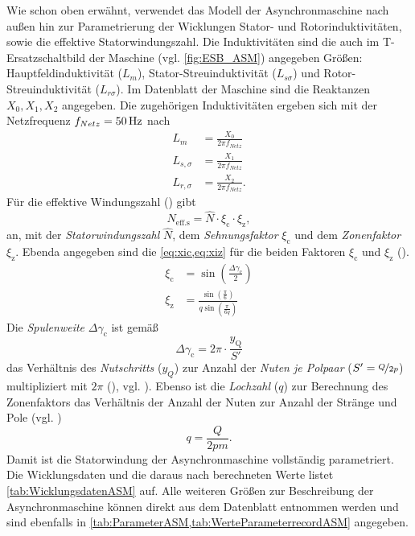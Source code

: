Wie schon oben erwähnt, verwendet das Modell der Asynchronmaschine nach außen hin zur Parametrierung der Wicklungen Stator- und Rotorinduktivitäten, sowie die effektive Statorwindungszahl. Die Induktivitäten sind die auch im T-Ersatzschaltbild der Maschine (vgl. \cref{fig:ESB_ASM}) angegeben Größen: Hauptfeldinduktivität (\(L_m\)), Stator-Streuinduktivität (\(L_{s\sigma}\)) und Rotor-Streuinduktivität (\(L_{r\sigma}\)). Im Datenblatt der Maschine sind die Reaktanzen \(X_0, X_1, X_2\) angegeben. Die zugehörigen Induktivitäten ergeben sich mit der Netzfrequenz \(f_{Netz}=\unit[50]{\mathrm{Hz}}\) nach
\begin{align}
    L_m &= \frac{X_0}{2\pi f_{Netz}} \\
    L_{s,\sigma} &= \frac{X_1}{2\pi f_{Netz}} \\
    L_{r,\sigma} &= \frac{X_2}{2\pi f_{Netz}}.
\end{align}
Für die effektive Windungszahl () gibt \cite[S. 217]{kralModelicaObjektorientierteModellbildung2019}
\begin{equation}
    N_{\mathrm{eff. s}} = \hat{N}\cdot\xi_{\mathrm{c}}\cdot\xi_{\mathrm{z}}\label{eq:effStatorTurns},
\end{equation}
an, mit der \emph{Statorwindungszahl} \(\hat{N}\), dem \emph{Sehnungsfaktor} \(\xi _{\mathrm{c}}\) und dem \emph{Zonenfaktor} \(\xi _{\mathrm{z}}\). Ebenda angegeben sind die \cref{eq:xic,eq:xiz} für die beiden Faktoren \(\xi _{\mathrm{c}}\) und \(\xi_{\mathrm{z}}\) (\cite[S. 165, S. 217]{kralModelicaObjektorientierteModellbildung2019}).
\begin{align}
    \xi _{\mathrm{c}} &= \sin(\frac{\Delta\gamma _{\mathrm{c}}}{2}) \label{eq:xic}\\
    \xi _{\mathrm{z}} &= \frac{\sin(\frac{\pi}{6})}{q\sin(\frac{\pi}{6q})}\label{eq:xiz}
\end{align}
Die \emph{Spulenweite} \(\Delta\gamma _{\mathrm{c}}\) ist gemäß
\begin{equation}
    \Delta\gamma _{\mathrm{c}} = 2\pi\cdot\frac{y _{\mathrm{Q}}}{S'}
\end{equation}
das Verhältnis des \emph{Nutschritts} (\(y_Q\)) zur Anzahl der \emph{Nuten je Polpaar} (\(S'=\nicefrac{Q}{2p}\)) multipliziert mit \(2\pi\) (\cite[S. 168, S. 161]{kralModelicaObjektorientierteModellbildung2019}), vgl. \cite[S. 76, S. 119]{binderElektrischeMaschinenUnd2012}). Ebenso ist die \emph{Lochzahl} (\(q\)) zur Berechnung des Zonenfaktors das Verhältnis der Anzahl der Nuten zur Anzahl der Stränge und Pole (vgl. \cite[S. 151]{kralModelicaObjektorientierteModellbildung2019})
\begin{equation}
    q = \frac{Q}{2pm}\label{eq:Lochzahl}.
\end{equation}
Damit ist die Statorwindung der Asynchronmaschine vollständig parametriert. Die Wicklungsdaten und die daraus nach  berechneten Werte listet \cref{tab:WicklungsdatenASM} auf. Alle weiteren Größen zur Beschreibung der Asynchronmaschine können direkt aus dem Datenblatt entnommen werden und sind ebenfalls in \cref{tab:ParameterASM,tab:WerteParameterrecordASM} angegeben. 


